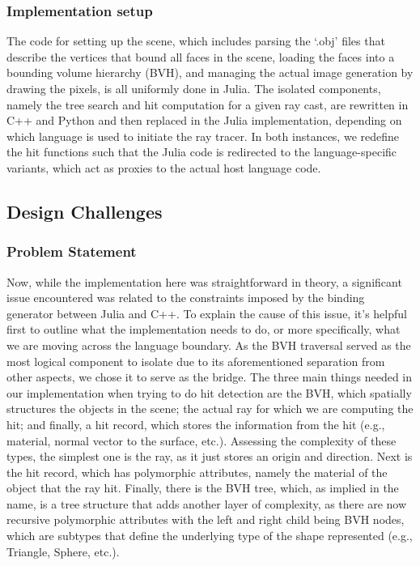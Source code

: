\subsubsection{Implementation setup}

The code for setting up the scene, which includes parsing the `.obj' files that describe the vertices that bound all faces in the scene, loading the faces into a bounding volume hierarchy (BVH), and managing the actual image generation by drawing the pixels, is all uniformly done in Julia. The isolated components, namely the tree search and hit computation for a given ray cast, are rewritten in C++ and Python and then replaced in the Julia implementation, depending on which language is used to initiate the ray tracer. In both instances, we redefine the hit functions such that the Julia code is redirected to the language-specific variants, which act as proxies to the actual host language code.

\subsection{Design Challenges}

\subsubsection{Problem Statement}

Now, while the implementation here was straightforward in theory, a significant issue encountered was related to the constraints imposed by the binding generator between Julia and C++. To explain the cause of this issue, it's helpful first to outline what the implementation needs to do, or more specifically, what we are moving across the language boundary. As the BVH traversal served as the most logical component to isolate due to its aforementioned separation from other aspects, we chose it to serve as the bridge. The three main things needed in our implementation when trying to do hit detection are the BVH, which spatially structures the objects in the scene; the actual ray for which we are computing the hit; and finally, a hit record, which stores the information from the hit (e.g., material, normal vector to the surface, etc.). Assessing the complexity of these types, the simplest one is the ray, as it just stores an origin and direction. Next is the hit record, which has polymorphic attributes, namely the material of the object that the ray hit. Finally, there is the BVH tree, which, as implied in the name, is a tree structure that adds another layer of complexity, as there are now recursive polymorphic attributes with the left and right child being BVH nodes, which are subtypes that define the underlying type of the shape represented (e.g., Triangle, Sphere, etc.). 

